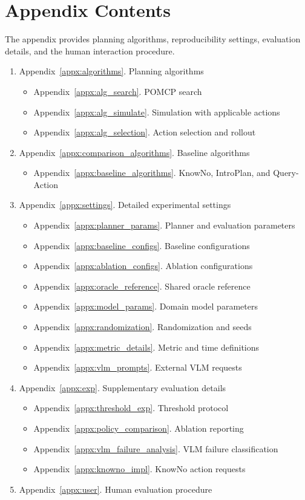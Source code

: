 \onecolumn
\setcounter{secnumdepth}{3}
\section*{Appendix Contents}
The appendix provides planning algorithms, reproducibility settings, evaluation details, and the human interaction procedure.

\begin{enumerate}
  \item Appendix~\ref{appx:algorithms}. Planning algorithms
  \begin{itemize}
    \item Appendix~\ref{appx:alg_search}. POMCP search
    \item Appendix~\ref{appx:alg_simulate}. Simulation with applicable actions
    \item Appendix~\ref{appx:alg_selection}. Action selection and rollout
  \end{itemize}
  \item Appendix~\ref{appx:comparison_algorithms}. Baseline algorithms
  \begin{itemize}
    \item Appendix~\ref{appx:baseline_algorithms}. KnowNo, IntroPlan, and Query-Action
  \end{itemize}
  \item Appendix~\ref{appx:settings}. Detailed experimental settings
  \begin{itemize}
    \item Appendix~\ref{appx:planner_params}. Planner and evaluation parameters
    \item Appendix~\ref{appx:baseline_configs}. Baseline configurations
    \item Appendix~\ref{appx:ablation_configs}. Ablation configurations
    \item Appendix~\ref{appx:oracle_reference}. Shared oracle reference
    \item Appendix~\ref{appx:model_params}. Domain model parameters
    \item Appendix~\ref{appx:randomization}. Randomization and seeds
    \item Appendix~\ref{appx:metric_details}. Metric and time definitions
    \item Appendix~\ref{appx:vlm_prompts}. External VLM requests
  \end{itemize}
  \item Appendix~\ref{appx:exp}. Supplementary evaluation details
  \begin{itemize}
    \item Appendix~\ref{appx:threshold_exp}. Threshold protocol
    \item Appendix~\ref{appx:policy_comparison}. Ablation reporting
    \item Appendix~\ref{appx:vlm_failure_analysis}. VLM failure classification
    \item Appendix~\ref{appx:knowno_impl}. KnowNo action requests
  \end{itemize}
  \item Appendix~\ref{appx:user}. Human evaluation procedure
\end{enumerate}

\newpage